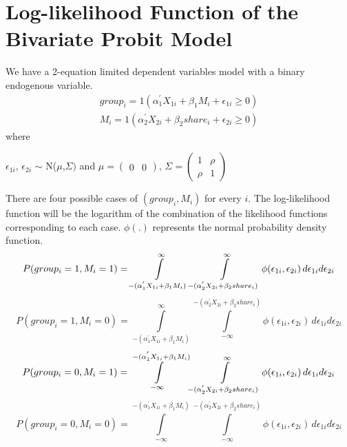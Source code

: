 \documentclass[11pt]{article}
\numberwithin{equation}{section}
\newcommand{\Int}{\int\limits}
\begin{document}
\section{Log-likelihood Function of the Bivariate Probit Model}
We have a 2-equation limited dependent variables model with a binary endogenous variable.
\begin{align}
group_i= 1(\alpha_1 ^{'} X_{1i}+ \beta_1 M_i+ \epsilon_{1i} \ge 0) \\
M_i= 1(\alpha_2 ^{'} X_{2i}+ \beta_2 share_i+\epsilon_{2i} \ge 0)
\end{align}
where
\begin{center}
$\epsilon_{1i}$, ${\epsilon_{2i}}$  $\sim$ N($\mu$,$\Sigma)$ and $\mu= \left( \begin{matrix} 0&0\end{matrix} \right)$, $\Sigma= \left( \begin{matrix} 1&\rho\\ \rho&1\end{matrix} \right)$
\end{center}
\par

There are four possible cases of $(group_i, M_i)$ for every $i$. The log-likelihood function will be the logarithm of the combination of the likelihood functions corresponding to each case. $\phi(.)$ represents the normal probability density function.
\begin{equation}
P(group_i=1, M_i=1)=\Int_{-(\alpha_1 ^{'} X_{1i}+ \beta_1 M_i)}^{\infty} \Int_{-(\alpha_2 ^{'} X_{2i}+ \beta_2 share_i)}^{\infty} \phi {(\epsilon_{1i} , \epsilon_{2i})} \, d\epsilon_{1i} d\epsilon_{2i}\\
\end{equation}
\begin{equation}
P(group_i=1, M_i=0)=\Int_{-(\alpha_1 ^{'} X_{1i}+ \beta_1 M_i)}^{\infty} \Int_{-\infty}^{-(\alpha_2 ^{'} X_{2i}+ \beta_2 share_i)} \phi {(\epsilon_{1i} , \epsilon_{2i})} \, d\epsilon_{1i} d\epsilon_{2i}
\end{equation}
\begin{equation}
P(group_i=0, M_i=1)=\Int_{-\infty}^{-(\alpha_1 ^{'} X_{1i}+ \beta_1 M_i)} \Int_{-(\alpha_2 ^{'} X_{2i}+ \beta_2 share_i)}^{\infty} \phi {(\epsilon_{1i} , \epsilon_{2i})} \, d\epsilon_{1i} d\epsilon_{2i}\\
\end{equation}
\begin{equation}
P(group_i=0, M_i=0)=\Int_{-\infty}^{-(\alpha_1 ^{'} X_{1i}+ \beta_1 M_i)}\Int_{-\infty}^{-(\alpha_2 ^{'} X_{2i}+ \beta_2 share_i)} \phi {(\epsilon_{1i} , \epsilon_{2i})} \, d\epsilon_{1i} d\epsilon_{2i}
\end{equation}
\end{document}

